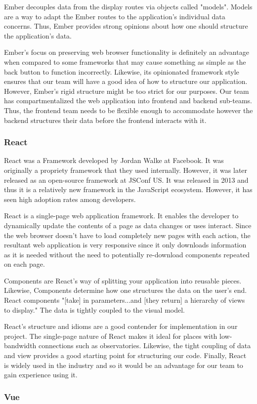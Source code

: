 \documentclass[12pt]{report}
\begin{document}
Ember decouples data from the display routes via objects called "models".\cite{embermodel} Models are a way to adapt the Ember routes to the application's individual data concerns. Thus, Ember provides strong opinions about how one should structure the application's data.

Ember's focus on preserving web browser functionality is definitely an advantage when compared to some frameworks that may cause something as simple as the back button to function incorrectly. Likewise, its opinionated framework style ensures that our team will have a good idea of how to structure our application. However, Ember's rigid structure might be too strict for our purposes. Our team has compartmentalized the web application into frontend and backend sub-teams. Thus, the frontend team needs to be flexible enough to accommodate however the backend structures their data before the frontend interacts with it.

\subsubsection*{React}

React was a Framework developed by Jordan Walke at Facebook. It was originally a propriety framework that they used internally. However, it was later released as an open-source framework at JSConf US.\cite{reactlaunch} It was released in 2013 and thus it is a relatively new framework in the JavaScript ecosystem.\cite{reactlaunch} However, it has seen high adoption rates among developers.

React is a single-page web application framework. It enables the developer to dynamically update the contents of a page as data changes or uses interact. Since the web browser doesn't have to load completely new pages with each action, the resultant web application is very responsive since it only downloads information as it is needed without the need to potentially re-download components repeated on each page.

Components are React's way of splitting your application into reusable pieces. Likewise, Components determine how one structures the data on the user's end. React components "[take] in parameters...and [they return] a hierarchy of views to display."\cite{reacttutorial} The data is tightly coupled to the visual model.

React's structure and idioms are a good contender for implementation in our project. The single-page nature of React makes it ideal for places with low-bandwidth connections such as observatories. Likewise, the tight coupling of data and view provides a good starting point for structuring our code. Finally, React is widely used in the industry and so it would be an advantage for our team to gain experience using it.

\subsubsection*{Vue}

\cite{vuelaunch}

\printbibliography[title={References}]
\end{document}
